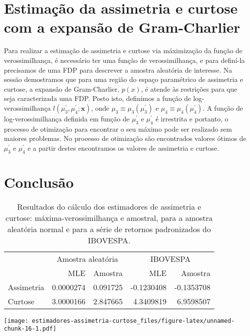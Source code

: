 \documentclass[]{article}
\begin{document}
\section{Estimação da assimetria e curtose com a expansão de
Gram-Charlier}\label{sec:meandiff}

Para realizar a estimação de assimetria e curtose via máximização da
função de verossimilhança, é necessário ter uma função de
verossimilhança, e para definí-la precisamos de uma FDP para descrever a
amostra aleatória de interesse. Na sessão demostramos que para uma
região do espaço paramétrico de assimetria e curtose, a expansão de
Gram-Charlier, \(p(x)\), é atende às restrições para que seja
caracterizada uma FDP. Posto isto, definimos a função de
log-verossimilhança \(l(\mu_3^\prime, \mu_4^\prime; \mathbf{x})\), onde
\(\mu_3 \equiv \mu_3(\mu_3^\prime)\) e
\(\mu_4 \equiv \mu_4(\mu_4^\prime)\). A função de log-verossimilhança
definida em função de \(\mu_3^\prime\) e \(\mu_4^\prime\) é irrestrita e
portanto, o processo de otimização para encontrar o seu máximo pode ser
realizado sem maiores problemas. No processo de otimização são
encontrados valores ótimos de \(\mu_3^\prime\) e \(\mu_4^\prime\) e a
partir destes encontramos os valores de assimetria e curtose.

\section{Conclusão}\label{conclusao}

\begin{table}

\caption{\label{tab:unnamed-chunk-14}Resultados do cálculo dos estimadores de assimetria e curtose: máxima-verossimilhança e amostral, para a amostra aleatória normal e para a série de retornos padronizados do IBOVESPA.}
\centering
\begin{tabular}[t]{lrrrr}
\toprule
\multicolumn{1}{c}{ } & \multicolumn{2}{c}{Amostra aleatória} & \multicolumn{2}{c}{IBOVESPA} \\
\cmidrule(l{2pt}r{2pt}){2-3} \cmidrule(l{2pt}r{2pt}){4-5}
  & MLE & Amostra & MLE & Amostra\\
\midrule
Assimetria & 0.0000274 & 0.091725 & -0.1230408 & -0.1353708\\
Curtose & 3.0000166 & 2.847665 & 4.3409819 & 6.9598507\\
\bottomrule
\end{tabular}
\end{table}

\texttt{[image: estimadores-assimetria-curtose\_files/figure-latex/unnamed-chunk-16-1.pdf]}
\end{document}
